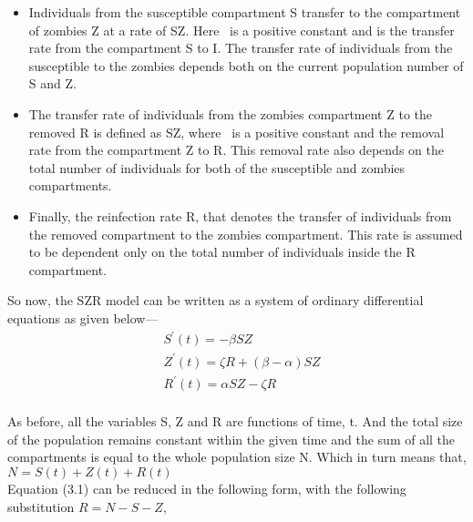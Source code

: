 \begin{itemize}
	\item Individuals from the susceptible compartment S transfer to the compartment of zombies Z at a rate of \textbeta SZ. Here \textbeta \ is a positive constant and is the transfer rate from the compartment S to I. The transfer rate of individuals from the susceptible to the zombies depends both on the current population number of S and Z. \\
	
	\item The transfer rate of individuals from the zombies compartment Z to the removed R is defined as \textalpha SZ, where \textalpha \ is a positive constant and the removal rate from the compartment Z to R. This removal rate also depends on the total number of individuals for both of the susceptible and zombies compartments. \\
	
	\item Finally, the reinfection rate \textzeta R, that denotes the transfer of individuals from the removed compartment to the zombies compartment. This rate is assumed to be dependent only on the total number of individuals inside the R compartment.
\end{itemize}

So now, the SZR model can be written as a system of ordinary differential equations as given below--- \\

\begin{equation}
\begin{aligned}
&S^{\prime}(t)=-\beta SZ \\
&Z^{\prime}(t)=\zeta R + (\beta - \alpha)SZ \\
&R^{\prime}(t)=\alpha SZ - \zeta R \\
\end{aligned}
\end{equation}

As before, all the variables S, Z and R are functions of time, t. And the total size of the population remains constant within the given time and the sum of all the compartments is equal to the whole population size N. Which in turn means that, \\

$ N = S(t) + Z(t) + R(t)$ 
\\

Equation (3.1) can be reduced in the following form, with the following substitution $R = N - S - Z$, \\

